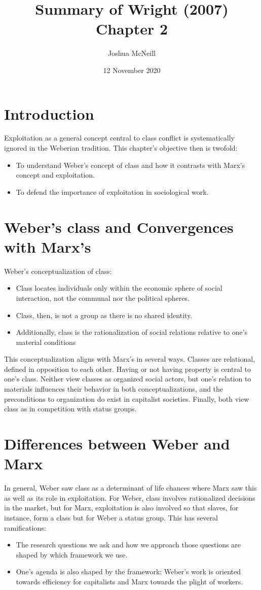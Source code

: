 \documentclass{article}
\title{Summary of Wright (2007) Chapter 2}
\author{Joshua McNeill}
\date{12 November 2020}
\begin{document}
  \maketitle
  \section{Introduction}
    Exploitation as a general concept central to class conflict is systematically ignored in the Weberian tradition.
    This chapter's objective then is twofold:
    \begin{itemize}
      \item To understand Weber's concept of class and how it contrasts with Marx's concept and exploitation.
      \item To defend the importance of exploitation in sociological work.
    \end{itemize}
  \section{Weber's class and Convergences with Marx's}
    Weber's conceptualization of class:
    \begin{itemize}
      \item Class locates individuals only within the economic sphere of social interaction, not the communal nor the political spheres.
      \item Class, then, is not a group as there is no shared identity.
      \item Additionally, class is the rationalization of social relations relative to one's material conditions
    \end{itemize}
    This conceptualization aligns with Marx's in several ways.
    Classes are relational, defined in opposition to each other.
    Having or not having property is central to one's class.
    Neither view classes as organized social actors, but one's relation to materials influences their behavior in both conceptualizations, and the preconditions to organization do exist in capitalist societies.
    Finally, both view class as in competition with status groups.
  \section{Differences between Weber and Marx}
    In general, Weber saw class as a determinant of life chances where Marx saw this as well as its role in exploitation.
    For Weber, class involves rationalized decisions in the market, but for Marx, exploitation is also involved so that slaves, for instance, form a class but for Weber a status group.
    This has several ramifications:
    \begin{itemize}
      \item The research questions we ask and how we approach those questions are shaped by which framework we use.
      \item One's agenda is also shaped by the framework: Weber's work is oriented towards efficiency for capitalists and Marx towards the plight of workers.
    \end{itemize}
\end{document}
